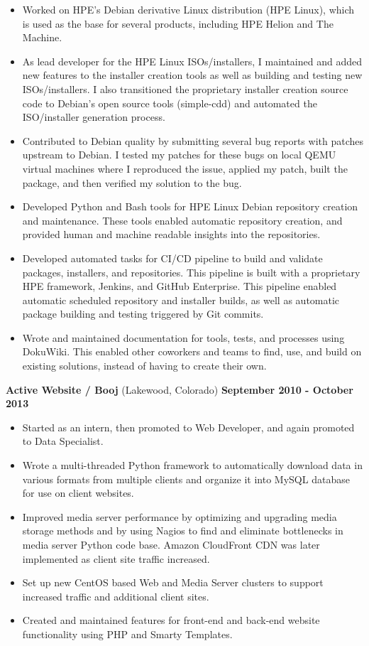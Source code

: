 \documentclass[letterpaper,10pt]{article}
\begin{document}
        \begin{itemize}
            \item Worked on HPE's Debian derivative Linux distribution (HPE Linux), which is used as the base for several products, including HPE Helion and The Machine.
            \item As lead developer for the HPE Linux ISOs/installers, I maintained and added new features to the installer creation tools as well as building and testing new ISOs/installers. I also transitioned the proprietary installer creation source code to Debian's open source tools (simple-cdd) and automated the ISO/installer generation process.
            \item Contributed to Debian quality by submitting several bug reports with patches upstream to Debian. I tested my patches for these bugs on local QEMU virtual machines where I reproduced the issue, applied my patch, built the package, and then verified my solution to the bug.
            \item Developed Python and Bash tools for HPE Linux Debian repository creation and maintenance. These tools enabled automatic repository creation, and provided human and machine readable insights into the repositories.
            \item Developed automated tasks for CI/CD pipeline to build and validate packages, installers, and repositories. This pipeline is built with a proprietary HPE framework, Jenkins, and GitHub Enterprise. This pipeline enabled automatic scheduled repository and installer builds, as well as automatic package building and testing triggered by Git commits.
            \item Wrote and maintained documentation for tools, tests, and processes using DokuWiki. This enabled other coworkers and teams to find, use, and build on existing solutions, instead of having to create their own.
        \end{itemize}
        \vspace*{2ex}
        \textbf{Active Website / Booj} (Lakewood, Colorado) \hfill \textbf{September 2010 - October 2013}
        \begin{itemize}
            \item Started as an intern, then promoted to Web Developer, and again promoted to Data Specialist.
            \item Wrote a multi-threaded Python framework to automatically download data in various formats from multiple clients and organize it into MySQL database for use on client websites.
            \item Improved media server performance by optimizing and upgrading media storage methods and by using Nagios to find and eliminate bottlenecks in media server Python code base. Amazon CloudFront CDN was later implemented as client site traffic increased.
            \item Set up new CentOS based Web and Media Server clusters to support increased traffic and additional client sites.
            \item Created and maintained features for front-end and back-end website functionality using PHP and Smarty Templates.
        \end{itemize}
\end{document}
